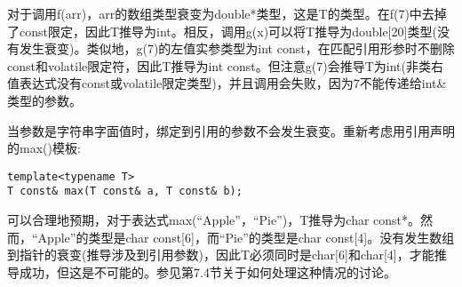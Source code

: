 对于调用f(arr)，arr的数组类型衰变为double*类型，这是T的类型。在f(7)中去掉了const限定，因此T推导为int。相反，调用g(x)可以将T推导为double[20]类型(没有发生衰变)。类似地，g(7)的左值实参类型为int const，在匹配引用形参时不删除const和volatile限定符，因此T推导为int const。但注意g(7)会推导T为int(非类右值表达式没有const或volatile限定类型)，并且调用会失败，因为7不能传递给int\&类型的参数。

当参数是字符串字面值时，绑定到引用的参数不会发生衰变。重新考虑用引用声明的max()模板:

\begin{lstlisting}[style=styleCXX]
template<typename T>
T const& max(T const& a, T const& b);
\end{lstlisting} 

可以合理地预期，对于表达式max(“Apple”，“Pie”)，T推导为char const*。然而，“Apple”的类型是char const[6]，而“Pie”的类型是char const[4]。没有发生数组到指针的衰变(推导涉及到引用参数)，因此T必须同时是char[6]和char[4]，才能推导成功，但这是不可能的。参见第7.4节关于如何处理这种情况的讨论。























 